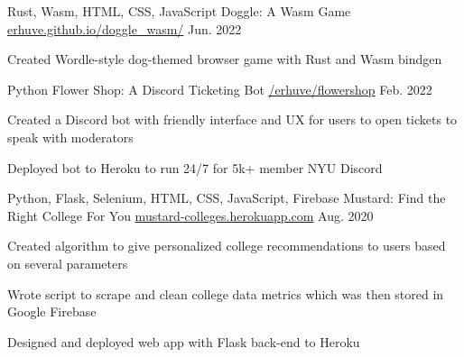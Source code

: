 

\begin{cventries}
  \cventry
    {Rust, Wasm, HTML, CSS, JavaScript} %
    {Doggle: A Wasm Game} %
    {\href{https://erhuve.github.io/doggle_wasm}{erhuve.github.io/doggle\_wasm/}} %
    {Jun. 2022} %
    {
      \begin{cvitems} %
        \item {Created Wordle-style dog-themed browser game with Rust and Wasm bindgen}
      \end{cvitems}
    }
    
  \cventry
    {Python} %
    {Flower Shop: A Discord Ticketing Bot} %
    {\href{https://github.com/erhuve/flowershop}{/erhuve/flowershop}} %
    {Feb. 2022} %
    {
      \begin{cvitems} %
        \item {Created a Discord bot with friendly interface and UX for users to open tickets to speak with moderators}
        \item {Deployed bot to Heroku to run 24/7 for 5k+ member NYU Discord}
      \end{cvitems}
    }

  \cventry
    {Python, Flask, Selenium, HTML, CSS, JavaScript, Firebase} %
    {Mustard: Find the Right College For You} %
    {\href{http://mustard-colleges.herokuapp.com/}{mustard-colleges.herokuapp.com}} %
    {Aug. 2020} %
    {
      \begin{cvitems} %
        \item {Created algorithm to give personalized college recommendations to users based on several parameters}
        \item {Wrote script to scrape and clean college data metrics which was then stored in Google Firebase}
        \item {Designed and deployed web app with Flask back-end to Heroku}
      \end{cvitems}
    }
\end{cventries}

